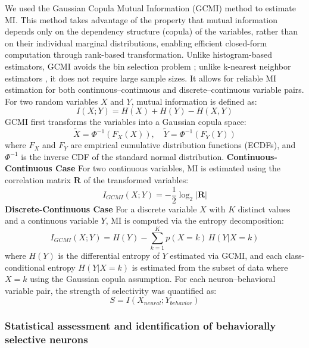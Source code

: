 We used the Gaussian Copula Mutual Information (GCMI) method
\cite{gcmi, ma2011mutual} to estimate MI. This method takes advantage of the
property that mutual information depends only on the dependency structure (copula)
of the variables, rather than on their individual marginal distributions, enabling
efficient closed-form computation through rank-based transformation. Unlike
histogram-based estimators, GCMI avoids the bin selection problem \cite{Ross2014};
unlike k-nearest neighbor estimators \cite{Kraskov2004}, it does not require large
sample sizes. It allows for reliable MI estimation for both continuous--continuous
and discrete--continuous variable pairs.
For two random variables $X$ and $Y$, mutual information is defined as:
\begin{equation}
\label{eq:mi_def}
I(X;Y) = H(X) + H(Y) - H(X,Y)
\end{equation}
GCMI first transforms the variables into a Gaussian copula space:
\begin{equation}
\label{eq:gcmi_transform}
\tilde{X} = \Phi^{-1}(F_X(X)), \quad \tilde{Y} = \Phi^{-1}(F_Y(Y))
\end{equation}
where $F_X$ and $F_Y$ are empirical cumulative distribution functions (ECDFs), and
$\Phi^{-1}$ is the inverse CDF of the standard normal distribution.
\textbf{Continuous-Continuous Case}
For two continuous variables, MI is estimated using the correlation matrix
$\mathbf{R}$ of the transformed variables:
\begin{equation}
\label{eq:gcmi_continuous}
I_{GCMI}(X;Y) = -\frac{1}{2}\log_2|\mathbf{R}|
\end{equation}
\textbf{Discrete-Continuous Case}
For a discrete variable $X$ with $K$ distinct values and a continuous variable $Y$,
MI is computed via the entropy decomposition:
\begin{equation}
\label{eq:gcmi_discrete}
I_{GCMI}(X;Y) = H(Y) - \sum_{k=1}^{K} p(X=k) \, H(Y | X=k)
\end{equation}
where $H(Y)$ is the differential entropy of $Y$ estimated via GCMI, and each
class-conditional entropy $H(Y|X=k)$ is estimated from the subset of data where
$X = k$ using the Gaussian copula assumption.
For each neuron--behavioral variable pair, the strength of selectivity was quantified
as:
\begin{equation}
\label{eq:selectivity_strength}
S = I(X_{neural}; Y_{behavior})
\end{equation}


\subsubsection{Statistical assessment and identification of behaviorally selective
neurons}
\label{sec:statistical_assessment}


